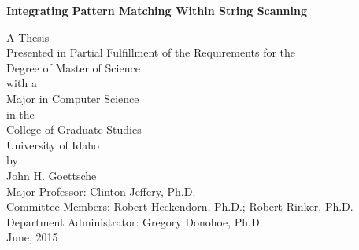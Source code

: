 \documentclass{article}
\begin{document}
\begin{titlepage}
\begin{center}
	\begin{Large}
	\textbf{Integrating Pattern Matching Within String Scanning}\\
	\end{Large}
	\begin{large}
	\vspace{5 pc}
	A Thesis\\
	Presented in Partial Fulfillment of the Requirements for the\\
	Degree of Master of Science\\
	with a\\
	Major in Computer Science\\
	in the\\
	College of Graduate Studies\\
	University of Idaho\\
	by\\John H. Goettsche\\
	\vspace{5 pc}
	Major Professor: Clinton Jeffery, Ph.D.\\
	Committee Members: Robert Heckendorn, Ph.D.; Robert Rinker, 	Ph.D.\\
	Department Administrator: Gregory Donohoe, Ph.D.\\
	\vspace{8 pc}
	June, 2015
	\end{large}
	\end{center}
\end{titlepage}

	
\thispagestyle{empty}
\end{document}
